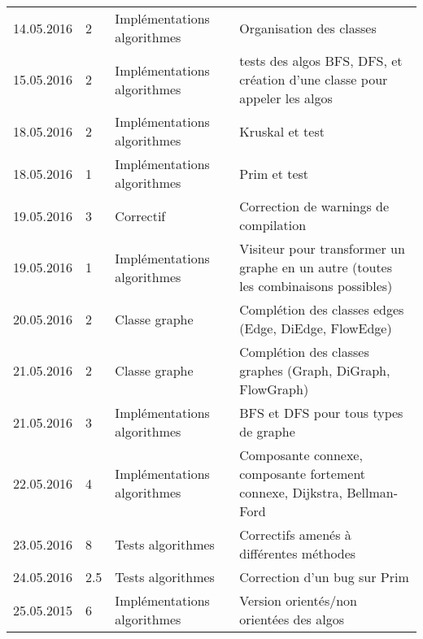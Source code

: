 \documentclass[french]{article}
\begin{document}
\begin{tabular}{p{}|p{}|p{}|p{}}
		14.05.2016 & 2 & Implémentations algorithmes & Organisation des classes \\
		15.05.2016 & 2 & Implémentations algorithmes & tests des algos BFS, DFS, et création d'une classe pour appeler les algos \\
		\hline
		18.05.2016 & 2 & Implémentations algorithmes & Kruskal et test\\
		18.05.2016 & 1 & Implémentations algorithmes & Prim et test\\
		19.05.2016 & 3 & Correctif & Correction de warnings de compilation\\
		19.05.2016 & 1 & Implémentations algorithmes & Visiteur pour transformer un graphe en un autre (toutes les combinaisons possibles)\\
		20.05.2016 & 2 & Classe graphe & Complétion des classes edges (Edge, DiEdge, FlowEdge)\\
		21.05.2016 & 2 & Classe graphe & Complétion des classes graphes (Graph, DiGraph, FlowGraph)\\
		21.05.2016 & 3 & Implémentations algorithmes & BFS et DFS pour tous types de graphe\\
		22.05.2016 & 4 & Implémentations algorithmes & Composante connexe, composante fortement connexe, Dijkstra, Bellman-Ford\\
		\hline
		23.05.2016 & 8 & Tests algorithmes & Correctifs amenés à différentes méthodes\\
		24.05.2016 & 2.5 & Tests algorithmes & Correction d'un bug sur Prim\\
		25.05.2015 & 6 & Implémentations algorithmes & Version orientés/non orientées des algos\\
	\end{tabular}
	
\end{document}
